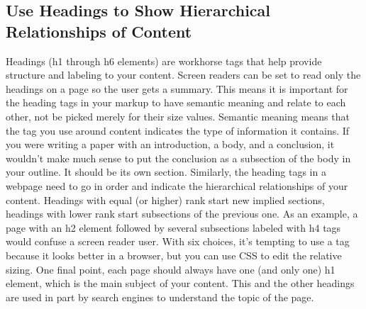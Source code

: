 \documentclass{article}%
\begin{document}
\subsection{Use Headings to Show Hierarchical Relationships of Content}%
\label{subsec:UseHeadingstoShowHierarchicalRelationshipsofContent}%
Headings (h1 through h6 elements) are workhorse tags that help provide structure and labeling to your content. Screen readers can be set to read only the headings on a page so the user gets a summary. This means it is important for the heading tags in your markup to have semantic meaning and relate to each other, not be picked merely for their size values.\newline%
Semantic meaning means that the tag you use around content indicates the type of information it contains.\newline%
If you were writing a paper with an introduction, a body, and a conclusion, it wouldn't make much sense to put the conclusion as a subsection of the body in your outline. It should be its own section. Similarly, the heading tags in a webpage need to go in order and indicate the hierarchical relationships of your content.\newline%
Headings with equal (or higher) rank start new implied sections, headings with lower rank start subsections of the previous one.\newline%
As an example, a page with an h2 element followed by several subsections labeled with h4 tags would confuse a screen reader user. With six choices, it's tempting to use a tag because it looks better in a browser, but you can use CSS to edit the relative sizing.\newline%
One final point, each page should always have one (and only one) h1 element, which is the main subject of your content. This and the other headings are used in part by search engines to understand the topic of the page.\newline%

%
\end{document}
